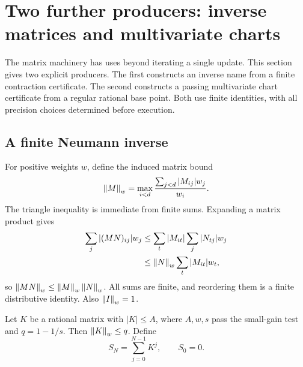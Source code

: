 \section{Two further producers: inverse matrices and multivariate charts}
\label{sec:applications}

The matrix machinery has uses beyond iterating a single update.
This section gives two explicit producers. The first constructs an
inverse name from a finite contraction certificate. The second
constructs a passing multivariate chart certificate from a regular
rational base point. Both use finite identities, with all precision
choices determined before execution.

\subsection{A finite Neumann inverse}

For positive weights \(w\), define the induced matrix bound
\[
 \left\lVert M\right\rVert_w=\max_{i<d}\frac{\sum_{j<d}|M_{ij}|w_j}{w_i}.
\]
The triangle inequality is immediate from finite sums. Expanding a
matrix product gives
\begin{align*}
 \sum_j|(MN)_{ij}|w_j
 &\le\sum_t|M_{it}|\sum_j|N_{tj}|w_j\\
 &\le\left\lVert N\right\rVert_w\sum_t|M_{it}|w_t,
\end{align*}
so \(\left\lVert MN\right\rVert_w\le\left\lVert M\right\rVert_w\left\lVert N\right\rVert_w\). All sums are finite,
and reordering them is a finite distributive identity. Also
\(\left\lVert I\right\rVert_w=1\).

Let \(K\) be a rational matrix with \(|K|\le A\), where
\(A,w,s\) pass the small-gain test and \(q=1-1/s\). Then
\(\left\lVert K\right\rVert_w\le q\). Define
\[
 S_N=\sum_{j=0}^{N-1}K^j,\qquad S_0=0.
\]


